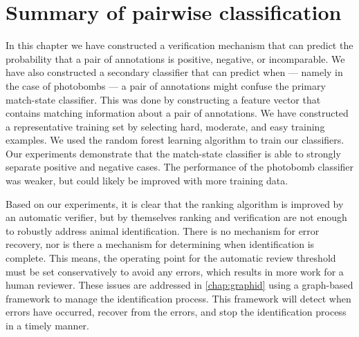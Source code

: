 \section{Summary of pairwise classification}\label{sec:pairconclusion}

    In this chapter we have constructed a verification mechanism that can predict the probability that a pair of
      annotations is positive, negative, or incomparable.
    We have also constructed a secondary classifier that can predict when --- namely in the case of photobombs
      --- a pair of annotations might confuse the primary match-state classifier.
    This was done by constructing a feature vector that contains matching information about a pair of
      annotations.
    We have constructed a representative training set by selecting hard, moderate, and easy training examples.
    We used the random forest learning algorithm to train our classifiers.
    Our experiments demonstrate that the match-state classifier is able to strongly separate positive and
      negative cases.
    The performance of the photobomb classifier was weaker, but could likely be improved with more training data.

    Based on our experiments, it is clear that the ranking algorithm is improved by an automatic verifier, but by
      themselves ranking and verification are not enough to robustly address animal identification.
    There is no mechanism for error recovery, nor is there a mechanism for determining when identification is
      complete.
    This means, the operating point for the automatic review threshold must be set conservatively to avoid any
      errors, which results in more work for a human reviewer.
    These issues are addressed in \cref{chap:graphid} using a graph-based framework to manage the identification
      process.
    This framework will detect when errors have occurred, recover from the errors, and stop the identification
      process in a timely manner.

